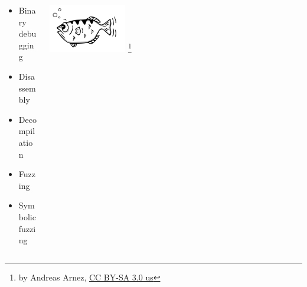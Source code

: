 
\begin{frame}








	\begin{columns}[t]
		\begin{column}{0.5\textwidth}
			\begin{itemize}
				\item Binary debugging
				\item Disassembly
				\item Decompilation
				\item Fuzzing
				\item Symbolic fuzzing
			\end{itemize}
		\end{column}
		\begin{column}{0.5\textwidth}
			\includegraphics[width=0.3\textwidth]{assets/GDB_Archer_Fish_by_Andreas_Arnez.svg.png}
			\footnote{\tiny by Andreas Arnez, \href{https://creativecommons.org/licenses/by-sa/3.0/us/deed.en}{CC BY-SA 3.0 us}}


\end{column}
\end{columns}
\end{frame}
